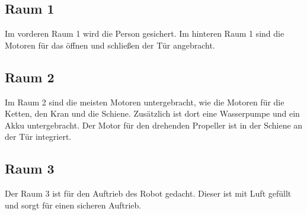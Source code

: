 \subsection{Raum 1}
Im vorderen Raum 1 wird die Person gesichert.
Im hinteren Raum 1 sind die Motoren für das öffnen und schließen der Tür angebracht.

\subsection{Raum 2}
Im Raum 2 sind die meisten Motoren untergebracht, wie die Motoren für die Ketten, den Kran und die Schiene.
Zusätzlich ist dort eine Wasserpumpe und ein Akku untergebracht.
Der Motor für den drehenden Propeller ist in der Schiene an der Tür integriert. 

\subsection{Raum 3}
Der Raum 3 ist für den Auftrieb des Robot gedacht. 
Dieser ist mit Luft gefüllt und sorgt für einen sicheren Auftrieb.







